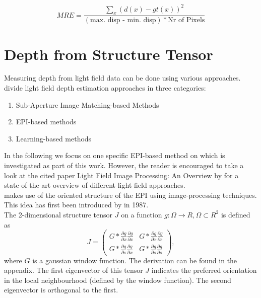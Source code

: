 \documentclass  [
  paper    = a4,
  BCOR     = 10mm,
  twoside,
  fontsize = 12pt,
  fleqn,
  toc      = bibnumbered,
  toc      = listofnumbered,
  numbers  = noendperiod,
  headings = normal,
  listof   = leveldown,
  version  = 3.03
]                                       {scrreprt}
\begin{document}
\begin{equation}\label{key}
MRE = \frac{\sum_{x} (d(x) - gt(x) )^2}{(\text{max. disp - min. disp})* \text{Nr of Pixels}}
\end{equation}

\section{Depth from Structure Tensor}
Measuring depth from light field data can be done using various approaches.
\cite{wu2017light} divide light field depth estimation approaches in three categories:
\begin{enumerate}
	\item Sub-Aperture Image Matching-based Methods
	\item EPI-based methods
	\item Learning-based methods
\end{enumerate}
In the following we focus on one specific EPI-based method on which is investigated as part of this work. However, the reader is encouraged to take a look at the cited paper \glqq Light Field Image Processing: An Overview \grqq by \cite{wu2017light} for a state-of-the-art overview of different light field approaches.\\
\cite{wanner2014orientation} makes use of the oriented structure of the EPI using image-processing techniques. This idea has first been introduced by \cite{bigun1987optimal} in 1987.\\

The 2-dimensional structure tensor $J$  on a function $g:\Omega \rightarrow \!R, \Omega \subset \!R^2 $ is defined as
\begin{equation}\label{eq:structuretensor}
J =\left(
\begin{matrix}
G*\frac{\partial g}{\partial x}\frac{\partial g}{\partial x} & G*\frac{\partial g}{\partial x}\frac{\partial g}{\partial s} \\
G*\frac{\partial g}{\partial s}\frac{\partial g}{\partial x} & G*\frac{\partial g}{\partial s}\frac{\partial g}{\partial s} 
\end{matrix}\right),
\end{equation}
 where $G$ is a gaussian window function. The derivation can be found in the appendix.
 The first eigenvector of this tensor $J$ indicates the preferred orientation in the local neighbourhood (defined by the window function). The second eigenvector is orthogonal to the first. 
 
\end{document}
